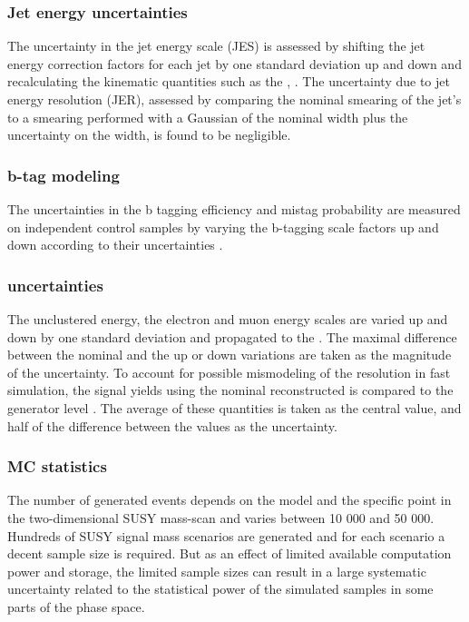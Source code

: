 \subsubsection*{Jet energy uncertainties}
\noindent\justify
The uncertainty in the jet energy scale (JES) is assessed by shifting the jet energy correction factors for each jet by one standard deviation up and down and recalculating the kinematic quantities such as the \ptmiss, \mttwo. 
The uncertainty due to jet energy resolution (JER), assessed by comparing the nominal smearing of the jet's \pt to a smearing performed with a Gaussian of the nominal width plus the uncertainty on the width, is found to be negligible.  
\subsubsection*{b-tag modeling} 
\noindent\justify
The uncertainties in the b tagging efficiency and mistag probability are measured on independent control samples by varying the b-tagging scale factors up and down according to their uncertainties \cite{Sirunyan:2017ezt}. 
\subsubsection*{\ptmiss uncertainties} 
\noindent\justify
The unclustered energy, the electron and muon energy scales are varied up and down by one standard deviation and propagated to the \ptmiss. 
The maximal difference between the nominal \ptmiss and the up or down variations are taken as the magnitude of the uncertainty. 
To account for possible mismodeling of the \ptmiss resolution in fast simulation, the signal yields using the nominal reconstructed \ptmiss is compared to the generator level \ptmiss. 
The average of these \ptmiss quantities is taken as the central value, and half of the difference between the values as the uncertainty. 
\subsubsection*{MC statistics} 
\noindent\justify
The number of generated events depends on the model and the specific point in the two-dimensional SUSY mass-scan and varies between 10 000 and 50 000.
Hundreds of SUSY signal mass scenarios are generated and for each scenario a decent sample size is required. 
But as an effect of limited available computation power and storage, the limited sample sizes can result in a large systematic uncertainty related to the statistical power of the simulated samples in some parts of the phase space. 
